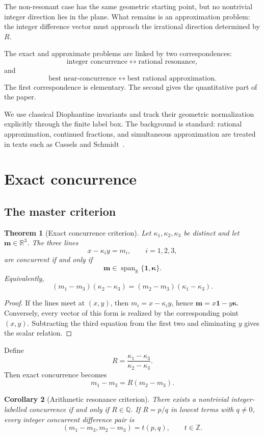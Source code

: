 \documentclass[11pt,a4paper]{article}
\newtheorem{theorem}{Theorem}[section]
\newtheorem{corollary}[theorem]{Corollary}
\begin{document}
The non-resonant case has the same geometric starting point, but no nontrivial integer direction lies in the plane. What remains is an approximation problem: the integer difference vector must approach the irrational direction determined by $R$.

The exact and approximate problems are linked by two correspondences:
\[
\boxed{\text{integer concurrence}}
\longleftrightarrow
\boxed{\text{rational resonance}},
\]
and
\[
\boxed{\text{best near-concurrence}}
\longleftrightarrow
\boxed{\text{best rational approximation}}.
\]
The first correspondence is elementary. The second gives the quantitative part of the paper.

We use classical Diophantine invariants and track their geometric normalization explicitly through the finite label box. The background is standard: rational approximation, continued fractions, and simultaneous approximation are treated in texts such as Cassels and Schmidt~\cite{cassels,schmidt1980,hardywright}.

\section{Exact concurrence}
\subsection{The master criterion}

\begin{theorem}[Exact concurrence criterion]\label{thm:exact}
Let $\kappa_1,\kappa_2,\kappa_3$ be distinct and let $\mathbf m\in\mathbb R^3$. The three lines
\[
x-\kappa_i y=m_i,\qquad i=1,2,3,
\]
are concurrent if and only if
\[
\mathbf m\in\operatorname{span}_{\mathbb R}\{\mathbf1,\boldsymbol\kappa\}.
\]
Equivalently,
\[
(m_1-m_3)(\kappa_2-\kappa_3)
=(m_2-m_3)(\kappa_1-\kappa_3).
\]
\end{theorem}

\begin{proof}
If the lines meet at $(x,y)$, then $m_i=x-\kappa_i y$, hence
$\mathbf m=x\mathbf1-y\boldsymbol\kappa$. Conversely, every vector of this form is realized by
the corresponding point $(x,y)$. Subtracting the third equation from the first two and eliminating
$y$ gives the scalar relation.
\end{proof}

Define
\[
R=\frac{\kappa_1-\kappa_3}{\kappa_2-\kappa_3}.
\]
Then exact concurrence becomes
\[
m_1-m_3=R(m_2-m_3).
\]

\begin{corollary}[Arithmetic resonance criterion]\label{cor:res}
There exists a nontrivial integer-labelled concurrence if and only if $R\in\mathbb Q$. If
$R=p/q$ in lowest terms with $q\ne0$, every integer concurrent difference pair is
\[
(m_1-m_3,m_2-m_3)=t(p,q),\qquad t\in\mathbb Z.
\]
\end{corollary}
\end{document}

